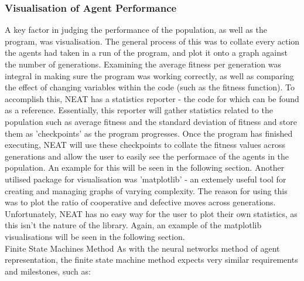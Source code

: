 \documentclass[12pt,a4paper]{article}
\makeatletter
\renewcommand\subsection{\@startsection {subsection}{1}{2mm}
                               {3pt plus 2pt minus 1pt}
                               {3pt plus 0pt}
                               {\normalfont\bfseries}}
\makeatother
\begin{document}
\subsubsection{Visualisation of Agent Performance}
A key factor in judging the performance of the population, as well as the program, was visualisation. The general process of this was to collate every action the agents had taken in a run of the program, and plot it onto a graph against the number of generations. Examining the average fitness per generation was integral in making sure the program was working correctly, as well as comparing the effect of changing variables within the code (such as the fitness function). To accomplish this, NEAT has a statistics reporter\cite{43} - the code for which can be found as a reference. Essentially, this reporter will gather statistics related to the population such as average fitness and the standard deviation of fitness and store them as 'checkpoints' as the program progresses. Once the program has finished executing, NEAT will use these checkpoints to collate the fitness values across generations and allow the user to easily see the performace of the agents in the population. An example for this will be seen in the following section. Another utilised package for visualisation was 'matplotlib'\cite{44} - an extemely useful tool for creating and managing graphs of varying complexity. The reason for using this was to plot the ratio of cooperative and defective moves across generations. Unfortunately, NEAT has no easy way for the user to plot their own statistics, as this isn't the nature of the library. Again, an example of the matplotlib visualisations will be seen in the following section. \\

\subsection{Finite State Machines Method}
As with the neural networks method of agent representation, the finite state machine method expects very similar requirements and milestones, such as: \\
\end{document}
